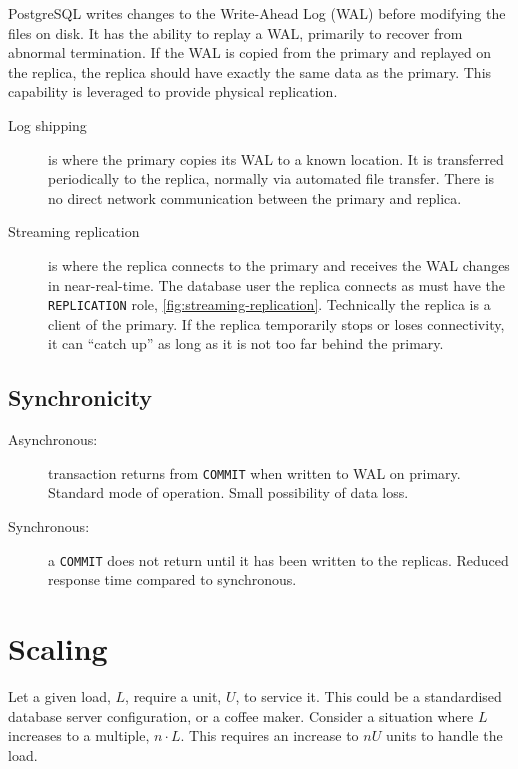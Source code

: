 \documentclass{pgnotes}
\begin{document}
PostgreSQL writes changes to the Write-Ahead Log (WAL) before modifying the files on disk.
It has the ability to replay a WAL, primarily to recover from abnormal termination.
If the WAL is copied from the primary and replayed on the replica, the replica should have exactly the same data as the primary.
This capability is leveraged to provide physical replication.
\begin{description}
\item[Log shipping] is where the primary copies its WAL to a known location.
  It is transferred periodically to the replica, normally via automated file transfer.
  There is no direct network communication between the primary and replica.
\item[Streaming replication] is where the replica connects to the primary and receives the WAL changes in near-real-time.
  The database user the replica connects as must have the \texttt{REPLICATION} role, \autoref{fig:streaming-replication}.
  Technically the replica is a client of the primary.
  If the replica temporarily stops or loses connectivity, it can ``catch up'' as long as it is not too far behind the primary.
\end{description}


\subsection{Synchronicity}

\begin{description}
\item[Asynchronous:] transaction returns from \texttt{COMMIT} when written to WAL on primary. Standard mode of operation. Small possibility of data loss.
\item[Synchronous:] a \texttt{COMMIT} does not return until it has been written to the replicas. Reduced response time compared to synchronous.
\end{description}

\section{Scaling}

Let a given load, $L$, require a unit, $U$, to service it. 
This could be a standardised database server configuration, or a coffee maker.
Consider a situation where $L$ increases to a multiple, $n \cdot L$.
This requires an increase to $nU$ units to handle the load.
\end{document}
